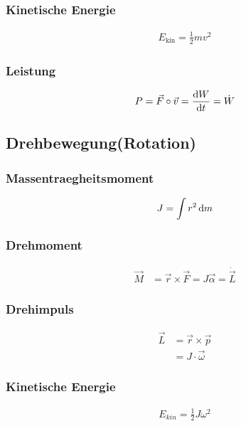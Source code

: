 \begin{multicols}{2}{}
\subsubsection*{Kinetische Energie}
\begin{align*}
E_{\text{kin}}=\frac{1}{2}mv^2
\end{align*}

\subsubsection*{Leistung}
\begin{align*}
P=\vec{F}\circ\vec{v}=\frac{\mathop{}\!\mathrm{d} W}{\mathop{}\!\mathrm{d} t}=\dot{W}
\end{align*}
\end{multicols}


\subsection{Drehbewegung(Rotation)}
\begin{multicols}{2}{}
\subsubsection*{Massentraegheitsmoment}
\begin{align*}
J=\int r^2 \mathop{}\!\mathrm{d} m
\end{align*}

\subsubsection*{Drehmoment}
\begin{align*}
\vec{M}&=\vec{r}\times\vec{F}=J\vec{\alpha}=\dot{\vec{L}}
\end{align*}
\end{multicols}

\begin{multicols}{2}{}
\subsubsection*{Drehimpuls}
\begin{align*}
\vec{L}&=\vec{r}\times\vec{p} \\
&=J\cdot \vec{\omega}
\end{align*}

\subsubsection*{Kinetische Energie}
\begin{align*}
E_{kin}=\frac{1}{2}J\omega^2 \\
\end{align*}
\end{multicols}

